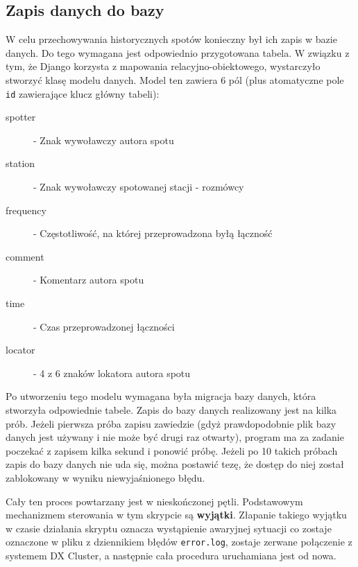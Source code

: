 \documentclass[]{mgr}
\begin{document}
            \subsection{Zapis danych do bazy}
            W celu przechowywania historycznych spotów konieczny był ich zapis w bazie danych. Do tego wymagana jest odpowiednio przygotowana tabela. W związku z tym, że Django korzysta z mapowania relacyjno-obiektowego, wystarczyło stworzyć klasę modelu danych. Model ten zawiera 6 pól (plus atomatyczne pole \texttt{id} zawierające klucz główny tabeli):
            \begin{description}
                \item[spotter] - Znak wywoławczy autora spotu
                \item[station] - Znak wywoławczy spotowanej stacji - rozmówcy
                \item[frequency] - Częstotliwość, na której przeprowadzona byłą łączność
                \item[comment] - Komentarz autora spotu
                \item[time] - Czas przeprowadzonej łączności
                \item[locator] - 4 z 6 znaków lokatora autora spotu
            \end{description}

            Po utworzeniu tego modelu wymagana była migracja bazy danych, która stworzyła odpowiednie tabele. Zapis do bazy danych realizowany jest na kilka prób. Jeżeli pierwsza próba zapisu zawiedzie (gdyż prawdopodobnie plik bazy danych jest używany i nie może być drugi raz otwarty), program ma za zadanie poczekać z zapisem kilka sekund i ponowić próbę. Jeżeli po 10 takich próbach zapis do bazy danych nie uda się, można postawić tezę, że dostęp do niej został zablokowany w wyniku niewyjaśnionego błędu.

            Cały ten proces powtarzany jest w nieskończonej pętli. Podstawowym mechanizmem sterowania w tym skrypcie są \textbf{wyjątki}. Złapanie takiego wyjątku w czasie działania skryptu oznacza wystąpienie awaryjnej sytuacji co zostaje oznaczone w pliku z dziennikiem błędów \texttt{error.log}, zostaje zerwane połączenie z systemem DX Cluster, a następnie cała procedura uruchamiana jest od nowa.
\end{document}
